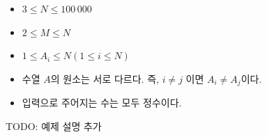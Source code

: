 \begin{itemize}
    \item $3 \le N \le 100\,000$
    \item $2 \le M \le N$
    \item $1 \le A_i \le N (1 \le i \le N)$
    \item 수열 $A$의 원소는 서로 다르다. 즉, $i \ne j$ 이면 $A_i \ne A_j$이다.
    \item 입력으로 주어지는 수는 모두 정수이다.
\end{itemize}

TODO: 예제 설명 추가
